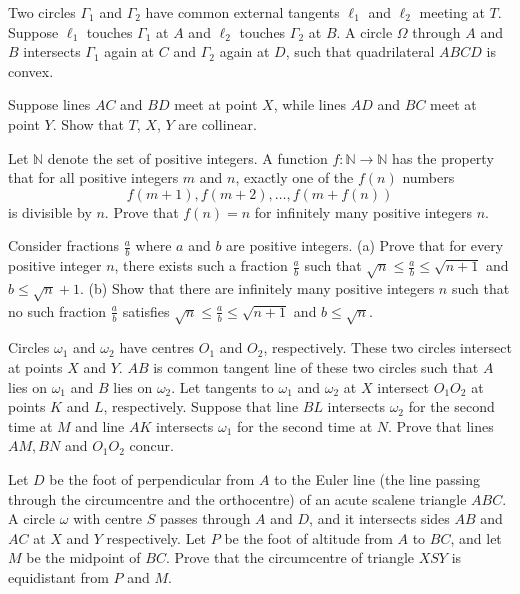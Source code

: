 \documentclass[11pt]{scrartcl}
\begin{document}
\begin{problem}[945532205287762]
Two circles $\Gamma_1$ and $\Gamma_2$ have common external tangents $\ell_1$ and $\ell_2$ meeting at $T$. Suppose $\ell_1$ touches $\Gamma_1$ at $A$ and $\ell_2$ touches $\Gamma_2$ at $B$. A circle $\Omega$ through $A$ and $B$ intersects $\Gamma_1$ again at $C$ and $\Gamma_2$ again at $D$, such that quadrilateral $ABCD$ is convex.

Suppose lines $AC$ and $BD$ meet at point $X$, while lines $AD$ and $BC$ meet at point $Y$. Show that $T$, $X$, $Y$ are collinear.
\end{problem}
\begin{problem}[1598288382590173390]
Let $\mathbb N$ denote the set of positive integers. A function $f\colon\mathbb N\to\mathbb N$ has the property that for all positive integers $m$ and $n$, exactly one of the $f(n)$ numbers
\[f(m+1),f(m+2),\ldots,f(m+f(n))\]is divisible by $n$. Prove that $f(n)=n$ for infinitely many positive integers $n$.
\end{problem}
\begin{problem}[2662630172971476475]
Consider fractions $\frac{a}{b}$ where $a$ and $b$ are positive integers.
(a) Prove that for every positive integer $n$, there exists such a fraction $\frac{a}{b}$ such that $\sqrt{n} \le \frac{a}{b} \le \sqrt{n+1}$ and $b \le \sqrt{n}+1$.
(b) Show that there are infinitely many positive integers $n$ such that no such fraction $\frac{a}{b}$ satisfies $\sqrt{n} \le \frac{a}{b} \le \sqrt{n+1}$ and $b \le \sqrt{n}$.
\end{problem}
\begin{problem}[7456007547971566183]
	Circles $\omega_1$ and $\omega_2$ have centres $O_1$ and $O_2$, respectively. These two circles intersect at points $X$ and $Y$. $AB$ is common tangent line of these two circles such that $A$ lies on $\omega_1$ and $B$ lies on $\omega_2$. Let tangents to $\omega_1$ and $\omega_2$ at $X$ intersect $O_1O_2$ at points $K$ and $L$, respectively. Suppose that line $BL$ intersects $\omega_2$ for the second time at $M$ and line $AK$ intersects $\omega_1$ for the second time at $N$. Prove that lines $AM, BN$ and $O_1O_2$ concur.
\end{problem}
\begin{problem}[762174477377522]
Let $D$ be the foot of perpendicular from $A$ to the Euler line (the line passing through the circumcentre and the orthocentre) of an acute scalene triangle $ABC$. A circle $\omega$ with centre $S$ passes through $A$ and $D$, and it intersects sides $AB$ and $AC$ at $X$ and $Y$ respectively. Let $P$ be the foot of altitude from $A$ to $BC$, and let $M$ be the midpoint of $BC$. Prove that the circumcentre of triangle $XSY$ is equidistant from $P$ and $M$.
\end{problem}
\end{document}
